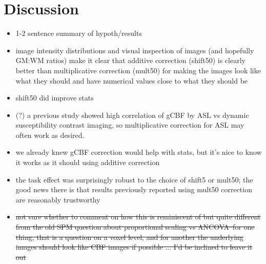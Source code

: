 \section{Discussion}

\begin{itemize}
\item 1-2 sentence summary of hypoth/results
\item image intensity distributions and visual inspection of images (and hopefully GM:WM ratios) make it clear that additive correction (shift50) is clearly better than multiplicative correction (mult50) for making the images look like what they should and have numerical values close to what they should be
\item shift50 did improve stats
\item (?) a previous study showed high correlation of gCBF by ASL vs dynamic susceptibility contrast imaging, so multiplicative correction for ASL may often work as desired.\cite{Knutsson_2010}
\item we already knew gCBF correction would help with stats,\cite{Black2008cASL}\cite{Henniger2009poster}\cite{22789842} but it's nice to know it works as it should using additive correction
\item the task effect was surprisingly robust to the choice of shift5 or mult50; the good news there is that results previously reported using  mult50 correction are reasonably trustworthy
\item \sout{not sure whether to comment on how this is reminiscent of but quite different from the old SPM question about proportional scaling vs ANCOVA--for one thing, that is a question on a voxel level, and for another the underlying images should look like CBF images if possible ... I'd be inclined to leave it out}
\end{itemize}


